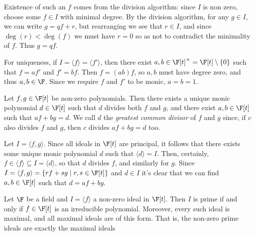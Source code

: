 \documentclass{maths}
\begin{document}
\begin{prf}
    Existence of such an $f$ comes from the division algorithm: since $I$ is non zero, choose some $f\in I$ with minimal degree.
    By the division algorithm, for any $g\in I$, we can write $g=qf+r$, but rearranging we see that $r\in I$, and since $\deg(r)<\deg(f)$ we must have $r=0$ so as not to contradict the minimality of $f$.
    Thus $g=qf$.

    For uniqueness, if $I=\langle f\rangle=\langle f'\rangle$, then there exist $a,b\in\F[t]^{\times}=\F[t]\setminus\{0\}$ such that $f=af'$ and $f'=bf$.
    Then $f=(ab)f$, so $a,b$ must have degree zero, and thus $a,b\in\F$.
    Since we require $f$ and $f'$ to be monic, $a=b=1$.
\end{prf}

\begin{lem}
    Let $f,g\in\F[t]$ be non-zero polynomials.
    Then there exists a unique monic polynomial $d\in\F[t]$ such that $d$ divides both $f$ and $g$, and there exist $a,b\in\F[t]$ such that $af+bg=d$.
    We call $d$ the \emph{greatest common divisor} of $f$ and $g$ since, if $c$ also divides $f$ and $g$, then $c$ divides $af+bg=d$ too.
\end{lem}

\begin{prf}
    Let $I=\langle f,g\rangle$.
    Since all ideals in $\F[t]$ are principal, it follows that there exists some unique monic polynomial $d$ such that $\langle d\rangle=I$.
    Then, certainly, $f\in\langle f\rangle\subseteq I=\langle d\rangle$, so that $d$ divides $f$, and similarly for $g$.
    Since $I=\langle f,g\rangle=\{rf+sg \mid r,s\in\F[t]\}$ and $d\in I$ it's clear that we can find $a,b\in\F[t]$ such that $d=af+bg$.
\end{prf}

\begin{lem}
    Let $\F$ be a field and $I=\langle f\rangle$ a non-zero ideal in $\F[t]$.
    Then $I$ is prime if and only if $f\in\F[t]$ is an irreducible polynomial.
    Moreover, every such ideal is maximal, and all maximal ideals are of this form.
    That is, the non-zero prime ideals are exactly the maximal ideals
\end{lem}
\end{document}
